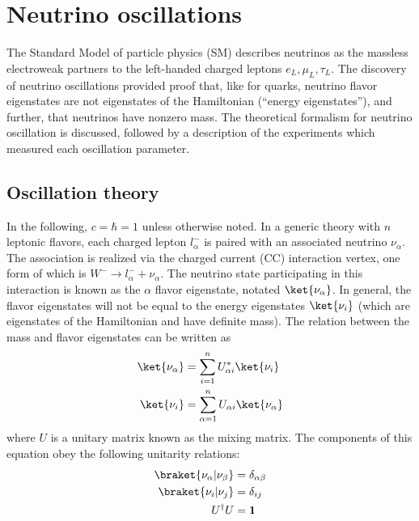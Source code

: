 \section{Neutrino oscillations}
\label{sec:osc_intro}

The Standard Model of particle physics (SM)
describes neutrinos as the massless electroweak partners
to the left-handed charged leptons $e_L,\mu_L,\tau_L$.
The discovery of neutrino oscillations provided proof that,
like for quarks, neutrino flavor eigenstates are not
eigenstates of the Hamiltonian (``energy eigenstates''),
and further, that neutrinos have nonzero mass.
The theoretical formalism for neutrino oscillation is discussed,
followed by a description of the experiments which measured
each oscillation parameter.

\subsection{Oscillation theory}
\label{subsec:theory}

In the following, $c = \hbar = 1$ unless otherwise noted.
In a generic theory with $n$ leptonic flavors,
each charged lepton $l_\alpha^-$ is paired with
an associated neutrino $\nu_\alpha$.
The association is realized via the charged current (CC) interaction vertex,
one form of which is $W^- \to l_\alpha^- + \nu_\alpha$.
The neutrino state participating in this interaction
is known as the $\alpha$ flavor eigenstate, notated $\ket{\nu_\alpha}$.
In general, the flavor eigenstates will not be equal to the energy eigenstates
$\ket{\nu_i}$
(which are eigenstates of the Hamiltonian and have definite mass).
The relation between the mass and flavor eigenstates can be written as
\begin{align}\label{eq:general_eigenstates}
    \begin{split}
        \ket{\nu_\alpha} &= \sum_{i=1}^n U^*_{\alpha i} \ket{\nu_i} \\
        \ket{\nu_i} &= \sum_{\alpha=1}^n U_{\alpha i} \ket{\nu_\alpha}
    \end{split}
\end{align}
where $U$ is a unitary matrix known as the mixing matrix.
The components of this equation obey the following unitarity relations:
\begin{align}\label{eq:unitarity}
    \begin{split}
        \braket{\nu_\alpha | \nu_\beta} &= \delta_{\alpha\beta} \\
        \braket{\nu_i | \nu_j} &= \delta_{ij} \\
        U^\dagger U &= \mathbf{1}
    \end{split}
\end{align}

